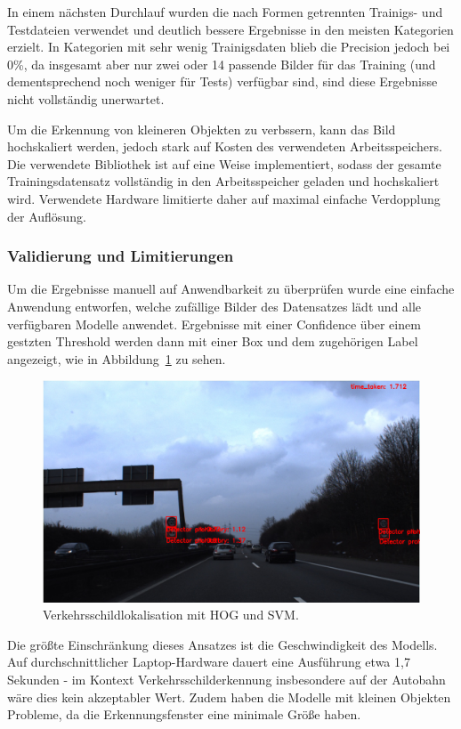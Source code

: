 \documentclass[runningheads]{llncs}
\begin{document}
In einem nächsten Durchlauf wurden die nach Formen getrennten Trainigs- und Testdateien verwendet und deutlich bessere Ergebnisse in den meisten Kategorien erzielt. In Kategorien mit sehr wenig Trainigsdaten blieb die Precision jedoch bei 0\%, da insgesamt aber nur zwei oder 14 passende Bilder für das Training (und dementsprechend noch weniger für Tests) verfügbar sind, sind diese Ergebnisse nicht vollständig unerwartet.

Um die Erkennung von kleineren Objekten zu verbssern, kann das Bild hochskaliert werden, jedoch stark auf Kosten des verwendeten Arbeitsspeichers. Die verwendete Bibliothek ist auf eine Weise implementiert, sodass der gesamte Trainingsdatensatz vollständig in den Arbeitsspeicher geladen und hochskaliert wird. Verwendete Hardware limitierte daher auf maximal einfache Verdopplung der Auflösung.

\subsubsection{Validierung und Limitierungen}
Um die Ergebnisse manuell auf Anwendbarkeit zu überprüfen wurde eine einfache Anwendung entworfen, welche zufällige Bilder des Datensatzes lädt und alle verfügbaren Modelle anwendet. Ergebnisse mit einer Confidence über einem gestzten Threshold werden dann mit einer Box und dem zugehörigen Label angezeigt, wie in Abbildung~\ref{fig2} zu sehen.

\begin{figure}[H]
    \centering
    \includegraphics[width=1\textwidth]{images/example_prediction.png}
    \caption{Verkehrsschildlokalisation mit HOG und SVM.}
    \label{fig2}
\end{figure}

Die größte Einschränkung dieses Ansatzes ist die Geschwindigkeit des Modells. Auf durchschnittlicher Laptop-Hardware dauert eine Ausführung etwa 1,7 Sekunden - im Kontext Verkehrsschilderkennung insbesondere auf der Autobahn wäre dies kein akzeptabler Wert. Zudem haben die Modelle mit kleinen Objekten Probleme, da die Erkennungsfenster eine minimale Größe haben.
\end{document}
